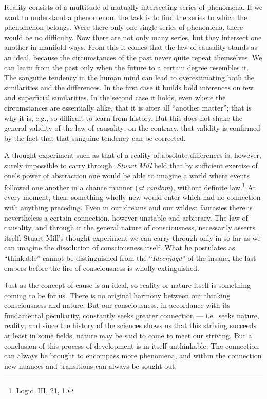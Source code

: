 \documentclass[12pt,a4paper]{book}
\newcommand{\opage}[1]{\marginnote{\footnotesize\textit{[#1]}}}
\begin{document}
Reality consists of a multitude of mutually intersecting series of
phenomena. If we want to understand a phenomenon, the task is to find the
series to which the phenomenon belongs. Were there only one single series
of phenomena, there would be no difficulty. Now there are not only many
series, but they intersect one another in manifold ways. From this it
comes that the law of causality stands as an ideal, because the
circumstances of the past never quite repeat themselves. We can learn
from the past only when the future to a certain degree resembles it. The
sanguine tendency in the human mind can lead to overestimating both the
similarities and the differences. In the first case it builds bold
inferences on few and superficial similarities. In the second case it
holds, even where the circumstances are essentially alike, that it is
after all ``another matter''; that is why it is, e.g., so difficult to
learn from history. But this does not shake the general validity of the
law of causality; on the contrary, that validity is confirmed by the
fact that that sanguine tendency can be corrected.


\opage{260}A thought-experiment such as that of a reality of absolute
differences is, however, surely impossible to carry through.
\emph{Stuart Mill} held that by sufficient exercise of one's power of
abstraction one would be able to imagine a world where events followed
one another in a chance manner (\textit{at random}), without definite
law.\footnote{Logic. III, 21, 1.} At every moment, then, something
wholly new would enter which had no connection with anything preceding.
Even in our dreams and our wildest fantasies there is nevertheless a
certain connection, however unstable and arbitrary. The law of
causality, and through it the general nature of consciousness,
necessarily asserts itself. Stuart Mill's thought-experiment we can carry
through only in so far as we can imagine the dissolution of
consciousness itself. What he postulates as ``thinkable'' cannot be
distinguished from the ``\textit{Ideenjagd}'' of the insane, the last
embers before the fire of consciousness is wholly extinguished.

Just as the concept of cause is an ideal, so reality or nature itself is
something coming to be for us. There is no original harmony between our
thinking consciousness and nature. But our consciousness, in accordance
with its fundamental peculiarity, constantly seeks greater connection
--- i.e.\ seeks nature, reality; and since the history of the sciences
shows us that this striving succeeds at least in some fields, nature may
be said to come to meet our striving. But a conclusion of this process of
development is in itself unthinkable. The connection can always be
brought to encompass more phenomena, and within the connection new
nuances and transitions can always be sought out.
\end{document}
